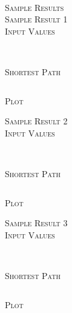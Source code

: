 \documentclass[pdftex,12pt,a4paper]{article}
\newcommand{\nspace}{\\[0.25cm]}
\newcommand{\lspace}{\\[0.50cm]}
\begin{document}
\hfill \lspace

\textsc{\Large Sample Results} \hfill \nspace

\textsc{\large Sample Result 1} \hfill \nspace

\textsc{Input Values} \hfill \nspace

\begin{verbatim}
\end{verbatim}

\hfill \nspace
\textsc{Shortest Path} \hfill \nspace

\begin{verbatim}
\end{verbatim}


\textsc{Plot} \hfill \nspace

\begin{figure}[h!]
  \centering
\end{figure}


\textsc{\large Sample Result 2} \hfill \nspace

\textsc{Input Values} \hfill \nspace

\begin{verbatim}
\end{verbatim}

\hfill \nspace
\textsc{Shortest Path} \hfill \nspace

\begin{verbatim}
\end{verbatim}


\textsc{Plot} \hfill \nspace

\begin{figure}[h!]
  \centering
\end{figure}


\textsc{\large Sample Result 3} \hfill \nspace

\textsc{Input Values} \hfill \nspace

\begin{verbatim}
\end{verbatim}

\hfill \nspace
\textsc{Shortest Path} \hfill \nspace

\begin{verbatim}
\end{verbatim}


\textsc{Plot} \hfill \nspace

\begin{figure}[h!]
  \centering
\end{figure}
\end{document}
